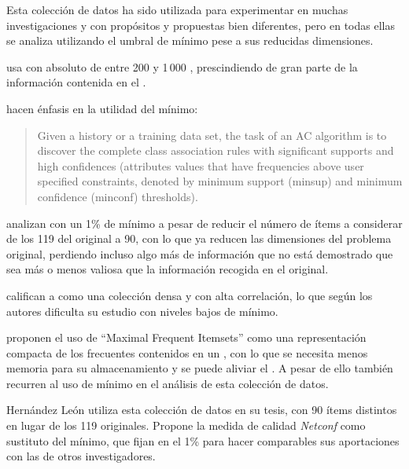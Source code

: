 \ABIERTO
Esta colección de datos ha sido utilizada para experimentar en muchas investigaciones y con propósitos y propuestas bien diferentes, pero en todas ellas se analiza utilizando el umbral de \soporte mínimo pese a sus reducidas dimensiones.

\citet{Borgelt-EfficientImplementationsOfAprioriAndEclat-2004} usa \mushroom con \soporte absoluto de entre 200 y 1\,000 \transacciones, prescindiendo de gran parte de la información contenida en el \dataset.

\citet{Suzuki-DiscoveringInterestingExceptionRulesWithRulePair-2004} 

\citet{ThabtahCowlingHammoud-ImprovingRuleSorting-2006} hacen énfasis en la utilidad del \soporte mínimo:
\begin{quote}
Given a history or a training data set, the task of an AC algorithm is to discover the complete class association rules with significant supports and high confidences (attributes values that have frequencies above user specified constraints, denoted by minimum support (minsup) and minimum confidence (minconf) thresholds).
\end{quote}

\citet{WangXinCoenen-MiningEfficientlySignificantCAR-2008} analizan \mushroom con un 1\% de \soporte mínimo a pesar de reducir el número de ítems a considerar de los 119 del \dataset original a 90, con lo que ya reducen las dimensiones del problema original, perdiendo incluso algo más de información que no está demostrado que sea más o menos valiosa que la información recogida en el \dataset original.


\citet{LiChen-MiningNonDerivableFIOverDataStream-2009} califican a \mushroom como una colección densa y con alta correlación, lo que según los autores dificulta su estudio con niveles bajos de \soporte mínimo.

\citet{LiZhang-MiningMaximalFIOnGraphicsProcessors-2010} proponen el uso de "`Maximal Frequent Itemsets"' como una representación compacta de los \itemsets frecuentes contenidos en un \dataset, con lo que se necesita menos memoria para su almacenamiento y se puede aliviar el \dilemaIR. A pesar de ello también recurren al uso de \soporte mínimo en el análisis de esta colección de datos.

Hernández León utiliza esta colección de datos en su tesis, con 90 ítems distintos en lugar de los 119 originales. Propone la medida de calidad \emph{Netconf} como sustituto del \soporte mínimo, que fijan en el 1\% para hacer comparables sus aportaciones con las de otros investigadores.

